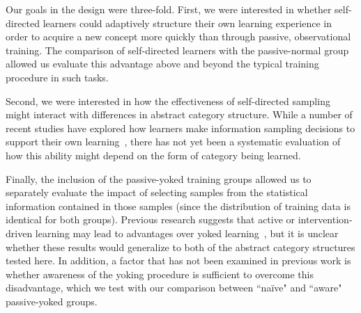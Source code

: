 \documentclass[3p,twocolumn,authoryear,10pt]{elsarticle}
\begin{document}




Our goals in the design were three-fold. First, we were interested in whether self-directed learners 
could adaptively structure their own learning experience in order to acquire a new concept more
quickly than through passive, observational training. The comparison of self-directed 
learners with the passive-normal group allowed us evaluate this advantage above and beyond 
the typical training procedure in such tasks.

Second, we were interested in how the effectiveness of self-directed sampling might interact with
differences in abstract category structure. While a number of recent studies have explored how learners make information sampling decisions to support their own learning~\citep{Nelson:2005ph,Castro:2008p12850,Kruschke:2008ph,Gureckis:2009p13894,Steyvers:2003p5901}, there has not yet been a systematic evaluation of how this ability might depend on the form of category being learned.

Finally, the inclusion of the passive-yoked training groups allowed us to separately evaluate the impact of 
selecting samples from the statistical information contained in those samples (since the distribution of training 
data is identical for both groups). Previous research suggests that active or intervention-driven learning may 
lead to advantages over yoked learning~\citep{Lagnado:2004p13374,sobel2006importance,Steyvers:2003p5901}, but it is unclear whether these results would generalize to both of the abstract category structures tested here. In addition, a factor that has not been examined in previous work is whether awareness of the yoking procedure is sufficient to overcome this disadvantage, which we test with our comparison between ``na\"ive" and ``aware" passive-yoked groups.

\end{document}
